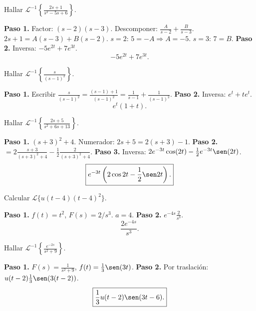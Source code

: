 \begin{prob}
Hallar $\mathcal{L}^{-1}\left\{\frac{2s+1}{s^2-5s+6}\right\}$.
\begin{myproof}
\textbf{Paso 1.} Factor: $(s-2)(s-3)$. Descomponer: $\frac{A}{s-2}+\frac{B}{s-3}$.
$2s+1 = A(s-3)+B(s-2)$. $s=2$: $5=-A\Rightarrow A=-5$. $s=3$: $7=B$.
\textbf{Paso 2.} Inversa: $-5e^{2t}+7e^{3t}$.
\[
\boxed{-5e^{2t}+7e^{3t}.}
\]
\end{myproof}
\end{prob}

\begin{prob}
Hallar $\mathcal{L}^{-1}\left\{\frac{s}{(s-1)^2}\right\}$.
\begin{myproof}
\textbf{Paso 1.} Escribir $\frac{s}{(s-1)^2} = \frac{(s-1)+1}{(s-1)^2} = \frac{1}{s-1} + \frac{1}{(s-1)^2}$.
\textbf{Paso 2.} Inversa: $e^t + t e^t$.
\[
\boxed{e^t(1+t).}
\]
\end{myproof}
\end{prob}

\begin{prob}
Hallar $\mathcal{L}^{-1}\left\{\frac{2s+5}{s^2+6s+13}\right\}$.
\begin{myproof}
\textbf{Paso 1.} $(s+3)^2+4$. Numerador: $2s+5 = 2(s+3)-1$.
\textbf{Paso 2.} $=2\frac{s+3}{(s+3)^2+4} - \frac{1}{2}\frac{2}{(s+3)^2+4}$.
\textbf{Paso 3.} Inversa: $2e^{-3t}\cos(2t) - \frac{1}{2}e^{-3t}\sen(2t)$.
\[
\boxed{e^{-3t}\left(2\cos 2t - \frac{1}{2}\sen 2t\right).}
\]
\end{myproof}
\end{prob}

\begin{prob}
Calcular $\mathcal{L}\{u(t-4)(t-4)^2\}$.
\begin{myproof}
\textbf{Paso 1.} $f(t)=t^2$, $F(s)=2/s^3$. $a=4$.
\textbf{Paso 2.} $e^{-4s}\frac{2}{s^3}$.
\[
\boxed{\frac{2e^{-4s}}{s^3}.}
\]
\end{myproof}
\end{prob}

\begin{prob}
Hallar $\mathcal{L}^{-1}\left\{\frac{e^{-2s}}{s^2+9}\right\}$.
\begin{myproof}
\textbf{Paso 1.} $F(s)=\frac{1}{s^2+9}$, $f(t)=\frac{1}{3}\sen(3t)$.
\textbf{Paso 2.} Por traslación: $u(t-2)\frac{1}{3}\sen(3(t-2))$.
\[
\boxed{\frac{1}{3}u(t-2)\sen(3t-6).}
\]
\end{myproof}
\end{prob}

